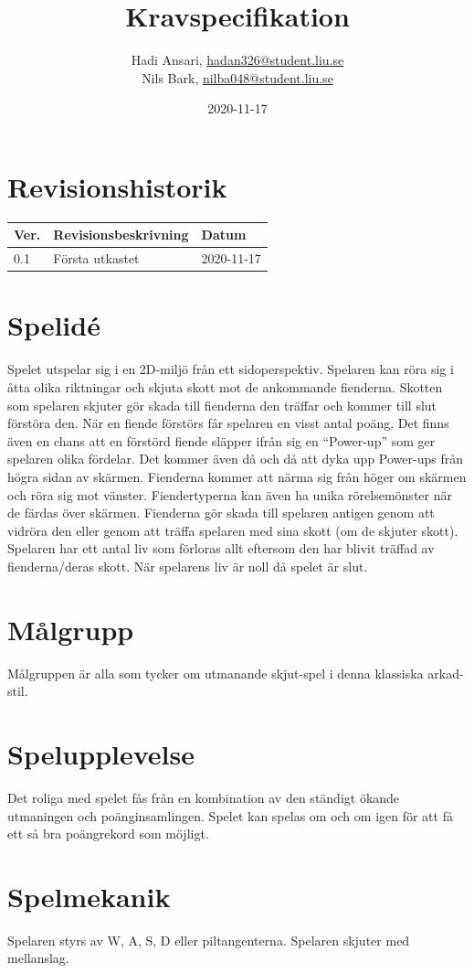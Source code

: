 \documentclass{TDP005mall}
\author{Hadi Ansari, \url{hadan326@student.liu.se}\\
  Nils Bark, \url{nilba048@student.liu.se}}
\title{Kravspecifikation}
\date{2020-11-17}
\begin{document}
\projectpage
\section{Revisionshistorik}
\begin{table}[!h]
\begin{tabularx}{\linewidth}{|l|X|l|}
\hline
Ver. & Revisionsbeskrivning & Datum \\\hline
0.1 & Första utkastet & 2020-11-17 \\\hline

\end{tabularx}
\end{table}


\section{Spelidé}
Spelet utspelar sig i en 2D-miljö från ett sidoperspektiv. Spelaren kan röra sig i åtta olika riktningar och skjuta skott mot de ankommande fienderna. Skotten som spelaren skjuter gör skada till fienderna den träffar och kommer till slut förstöra den. När en fiende förstörs får spelaren en visst antal poäng. Det finns även en chans att en förstörd fiende släpper ifrån sig en ``Power-up'' som ger spelaren olika fördelar. Det kommer även då och då att dyka upp Power-ups från högra sidan av skärmen. Fienderna kommer att närma sig från höger om skärmen och röra sig mot vänster. Fiendertyperna kan även ha unika rörelsemönster när de färdas över skärmen. Fienderna gör skada till spelaren antigen genom att vidröra den eller genom att träffa spelaren med sina skott (om de skjuter skott). Spelaren har ett antal liv som förloras allt eftersom den har blivit träffad av fienderna/deras skott. När spelarens liv är noll då spelet är slut.

\section{Målgrupp}
Målgruppen är alla som tycker om utmanande skjut-spel i denna klassiska arkad-stil.

\section{Spelupplevelse}
Det roliga med spelet fås från en kombination av den ständigt ökande utmaningen och poänginsamlingen. Spelet kan spelas om och om igen för att få ett så bra poängrekord som möjligt.

\section{Spelmekanik}
Spelaren styrs av W, A, S, D eller piltangenterna. Spelaren skjuter med mellanslag.
\end{document}
